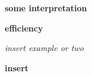 \documentclass[../../../main.tex]{subfiles}
\begin{document}
\textbf{some interpretation}

\begin{definition}
    \textbf{efficiency}
\end{definition}

\textit{insert example or two}

\begin{theorem}
    \textbf{insert}
\end{theorem}









\end{document}
